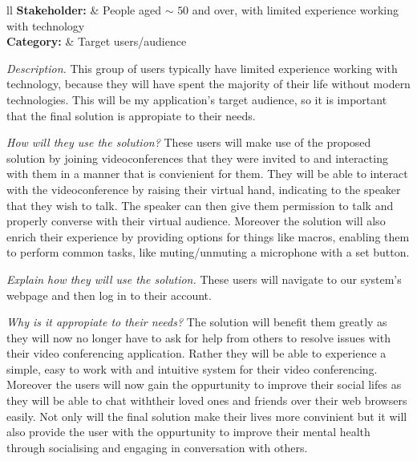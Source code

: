 \noindent
\begin{tblr}{ll}
  \textsf{\bfseries Stakeholder: } & {People aged $\sim$ 
  \hspace{-0.2cm} $50$ and over, with limited experience
  working with technology}\\
  \textsf{\bfseries Category: } & Target users/audience\\
\end{tblr}
\vspace{0.2cm}

\textit{Description.}  
This group of users typically have limited experience working 
with technology, because they will have spent the majority of
their life without modern technologies. This will be my 
application's target audience, so it is important that the 
final solution is appropiate to their needs. \vspace{0.2cm}

\textit{How will they use the solution?}
These users will make use of the proposed solution by joining
videoconferences that they were invited to and interacting with
them in a manner that is convienient for them. They will be 
able to interact with the videoconference by raising their 
virtual hand, indicating to the speaker that they wish to talk.
The speaker can then give them permission to talk and properly
converse with their virtual audience. Moreover the solution
will also enrich their experience by providing options for
things like macros, enabling them to perform common tasks,
like muting/unmuting a microphone with a set button.
\vspace{0.2cm}

\textit{Explain how they will use the solution.}
These users will navigate to our system's webpage and then
log in to their account.
\vspace{0.2cm}

\textit{Why is it appropiate to their needs?}
The solution will benefit them greatly as they will now no 
longer have to ask for help from others to resolve issues with
their video conferencing application. Rather they will be able
to experience a simple, easy to work with and intuitive system
for their video conferencing. Moreover the users will now gain
the oppurtunity to improve their social lifes as they will be
able to chat withtheir loved ones and friends over their web 
browsers easily. Not only will the final solution make their 
lives more convinient but it will also provide the user with
the oppurtunity to improve their mental health through
socialising and engaging in conversation with others.
\cite{social}
\vspace{0.2cm}

